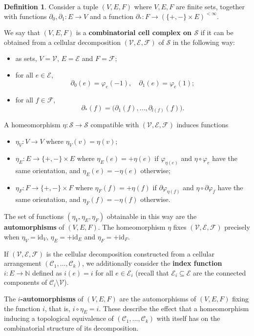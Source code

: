 \documentclass[11pt,reqno]{amsart}
\theoremstyle{plain}
\theoremstyle{definition}
\newtheorem{definition}[subsection]{Definition}
\theoremstyle{remark}
\numberwithin{equation}{subsection}
\newcommand*{\bbN}{\mathbb{N}}
\newcommand*{\calC}{\mathcal{C}}
\newcommand*{\calE}{\mathcal{E}}
\newcommand*{\calF}{\mathcal{F}}
\newcommand*{\calS}{\mathcal{S}}
\newcommand*{\calV}{\mathcal{V}}
\newcommand*{\id}{\mathrm{id}}
\begin{document}
\begin{definition}\label{def:ccc}
    Consider a tuple $(V,E,F)$ where $V,E,F$ are finite sets, together with functions $\partial_0,\partial_1\colon E\to V$ and a function $\partial_*\colon F\to(\{+,-\}\times E)^{<\infty}$.

    We say that $(V,E,F)$ is a \textbf{combinatorial cell complex on $\calS$} if it can be obtained from a cellular decomposition $(\calV,\calE,\calF)$ of $\calS$ in the following way:
    \begin{itemize}
        \item as sets, $V=\calV$, $E=\calE$ and $F=\calF$;
        \item for all $e\in\calE$,
        \[\partial_0(e)=\varphi_e(-1),\quad\partial_1(e)=\varphi_e(1);\]
        \item for all $f\in\calF$,
        \[\partial_*(f)=\big(\partial_1(f),\dots,\partial_{l(f)}(f)\big).\]
    \end{itemize}

    A homeomorphism $\eta\colon\calS\to\calS$ compatible with $(\calV,\calE,\calF)$ induces functions
    \begin{itemize}
        \item $\eta_V\colon V\to V$ where $\eta_V(v)=\eta(v)$;
        \item $\eta_E\colon E\to\{+,-\}\times E$ where $\eta_E(e)=+\eta(e)$ if $\varphi_{\eta(e)}$ and $\eta\circ\varphi_e$ have the same orientation, and $\eta_E(e)=-\eta(e)$ otherwise;
        \item $\eta_F\colon F\to\{+,-\}\times F$ where $\eta_F(f)=+\eta(f)$ if $\partial\varphi_{\eta(f)}$ and $\eta\circ\partial\varphi_f$ have the same orientation, and $\eta_F(f)=-\eta(f)$ otherwise.
    \end{itemize}
    The set of functions $(\eta_V,\eta_E,\eta_F)$ obtainable in this way are the \textbf{automorphisms} of $(V,E,F)$. The homeomorphism $\eta$ fixes $(\calV,\calE,\calF)$ precisely when $\eta_V=\id_V$, $\eta_E=+\id_E$ and $\eta_F=+\id_F$.

    If $(\calV,\calE,\calF)$ is the cellular decomposition constructed from a cellular arrangement $(\calC_1,\dots,\calC_k)$, we additionally consider the \textbf{index function} $i\colon E\to\bbN$ defined as $i(e)=i$ for all $e\in\calE_i$ (recall that $\calE_i\subseteq\calE$ are the connected components of $\calC_i\setminus\calV$).

    The \textbf{$i$-automorphisms} of $(V,E,F)$ are the automorphisms of $(V,E,F)$ fixing the function $i$, that is, $i\circ\eta_E=i$. These describe the effect that a homeomorphism inducing a topological equivalence of $(\calC_1,\dots,\calC_k)$ with itself has on the combinatorial structure of its decomposition.
\end{definition}
\end{document}
